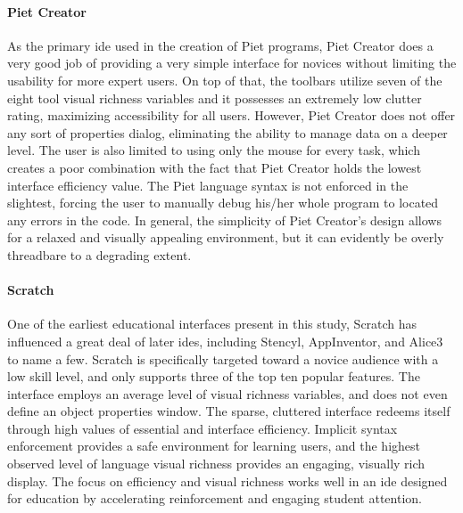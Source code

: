 \paragraph{Piet Creator} As the primary \ac{ide} used in the creation of
Piet programs, Piet Creator does a very good job of providing a very simple
interface for novices without limiting the usability for more expert users.
On top of that, the toolbars utilize seven of the eight tool visual
richness variables and it possesses an extremely low clutter rating,
maximizing accessibility for all users.  However, Piet Creator does not
offer any sort of properties dialog, eliminating the ability to manage data
on a deeper level. The user is also limited to using only the mouse for
every task, which creates a poor combination with the fact that Piet
Creator holds the lowest interface efficiency value. The Piet language
syntax is not enforced in the slightest, forcing the user to manually debug
his/her whole program to located any errors in the code. In general, the
simplicity of Piet Creator's design allows for a relaxed and visually
appealing environment, but it can evidently be overly threadbare to a
degrading extent.

\paragraph{Scratch} One of the earliest educational interfaces present in
this study, Scratch has influenced a great deal of later \acp{ide},
including Stencyl, AppInventor, and Alice3 to name a few. Scratch is
specifically targeted toward a novice audience with a low skill level, and
only supports three of the top ten popular features. The interface employs
an average level of visual richness variables, and does not even define an
object properties window. The sparse, cluttered interface redeems itself
through high values of essential and interface efficiency. Implicit syntax
enforcement provides a safe environment for learning users, and the highest
observed level of language visual richness provides an engaging, visually
rich display. The focus on efficiency and visual richness works well in an
\ac{ide} designed for education by accelerating reinforcement and engaging
student attention.

